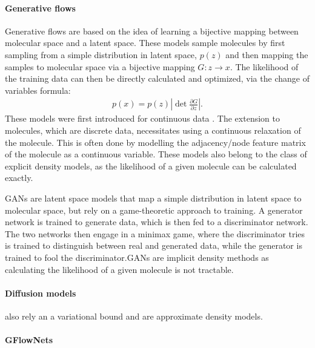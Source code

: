 \paragraph{Generative flows}
Generative flows are based on the idea of learning a bijective mapping between molecular space and a
latent space. These models sample molecules by first sampling from a simple distribution in latent
space, $p(z)$ and then mapping the samples to molecular space via a bijective mapping $G: z
      \rightarrow x$. The likelihood of the training data can then be directly calculated and optimized,
via the change of variables formula:
\begin{align}
      p(x) = p(z) \left| \det \frac{\partial G}{\partial z} \right|.
\end{align}
These models were first introduced for continuous data
\citet{rezendeVariationalInferenceNormalizing2016}. The extension to molecules, which are discrete
data, necessitates using a continuous relaxation of the molecule. This is often done by modelling
the adjacency/node feature matrix of the molecule as a continuous variable. These models also belong
to the class of explicit density models, as the likelihood of a given molecule can be calculated
exactly.

\Acp{GAN} are latent space models that map a simple distribution in latent space to molecular space,
but rely on a game-theoretic approach to training. A generator network is trained to
generate data, which is then fed to a discriminator network. The two networks then engage in a
minimax game, where the discriminator tries is trained to distinguish between real and generated
data, while the generator is trained to fool the discriminator.\@ \acp{GAN} are implicit density
methods as calculating the likelihood of a given molecule is not tractable.

\paragraph{Diffusion models} also rely an a variational bound and are approximate density models.

\paragraph{GFlowNets}


